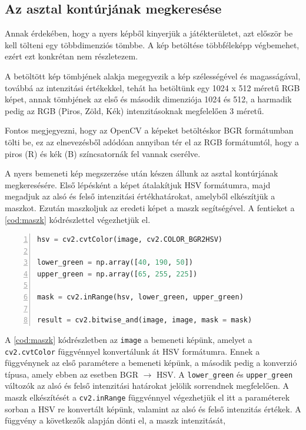 \subsection{Az asztal kontúrjának megkeresése}
Annak érdekében, hogy a nyers képből kinyerjük a játékterületet, azt először be kell tölteni egy többdimenziós tömbbe. A kép betöltése többféleképp végbemehet, ezért ezt konkrétan nem részletezem.
\par A betöltött kép tömbjének alakja megegyezik a kép szélességével és magasságával, továbbá az intenzitási értékekkel, tehát ha betöltünk egy 1024 x 512 méretű RGB képet, annak tömbjének az első és második dimenziója 1024 és 512, a harmadik pedig az RGB (Piros, Zöld, Kék) intenzitásoknak megfelelően 3 méretű.
\par Fontos megjegyezni, hogy az OpenCV a képeket betöltéskor BGR formátumban tölti be, ez az elnevezésből adódóan annyiban tér el az RGB formátumtól, hogy a piros (R) és kék (B) színcsatornák fel vannak cserélve.
\par A nyers bemeneti kép megszerzése után készen állunk az asztal kontúrjának megkeresésére. Első lépésként a képet átalakítjuk HSV formátumra, majd megadjuk az alsó és felső intenzitási értékhatárokat, amelyből elkészítjük a maszkot. Ezután maszkoljuk az eredeti képet a maszk segítségével.
\newline A fentieket a \ref{cod:maszk} kódrészlettel végezhetjük el.


\vspace{2mm}
\hspace{-10mm}
\begin{minipage}{\linewidth}
\begin{lstlisting}[language=Python, numbers=left, caption={A játékterület maszkolása.}, label={cod:maszk}]
hsv = cv2.cvtColor(image, cv2.COLOR_BGR2HSV)

lower_green = np.array([40, 190, 50])
upper_green = np.array([65, 255, 225])

mask = cv2.inRange(hsv, lower_green, upper_green)

result = cv2.bitwise_and(image, image, mask = mask)
\end{lstlisting}
\end{minipage}

\par A \ref{cod:maszk} kódrészletben az \lstinline{image} a bemeneti képünk, amelyet a \lstinline{cv2.cvtColor} függvénnyel \cite{cv2_cvt_color} konvertálunk át HSV formátumra. Ennek a függvénynek az első paramétere a bemeneti képünk, a második pedig a konverzió típusa, amely ebben az esetben BGR $\rightarrow$ HSV. A \lstinline{lower_green} és \lstinline{upper_green} változók az alsó és felső intenzitási határokat jelölik sorrendnek megfelelően. A maszk elkészítését a \lstinline{cv2.inRange} függvénnyel \cite{cv2_in_range} végezhetjük el itt a paraméterek sorban a HSV re konvertált képünk, valamint az alsó és felső intenzitás értékek.
\newline A függvény a következők alapján dönti el, a maszk intenzitását,

